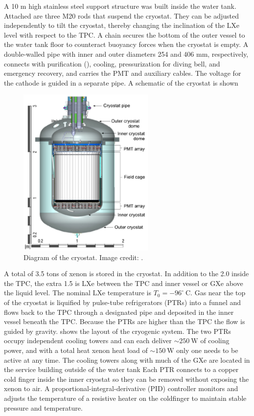 A 10 m high stainless steel support structure was built inside the water tank.  Attached are three M20 rods that suspend the
cryostat.  They can be adjusted independently to tilt the cryostat, thereby changing the inclination of the LXe level with respect to the
TPC.  A chain secures the bottom of the outer vessel to the water tank floor to counteract buoyancy forces when the cryostat is empty.  A
double-walled pipe with inner and outer diameters 254 and 406 mm, respectively, connects with purification (),
cooling,
pressurization for diving bell, and emergency recovery, and carries the PMT and auxiliary cables.  The voltage for the cathode is guided
in a separate pipe.  A schematic of the cryostat is shown

\begin{figure}
\centering
\includegraphics[width=0.6\textwidth]{CryostatDiagram}
\caption{Diagram of the cryostat.  Image credit: .}
\label{fig:xenon1t_cryo_cryostat_diagram}
\end{figure}

A total of 3.5 tons of xenon is stored in the cryostat.  In addition to the 2.0 inside the TPC, the extra 1.5 is LXe between the
TPC and inner vessel or GXe above the liquid level.  The nominal LXe temperature is $T_{0} = -96^{\circ}\ \mathrm{C}$.  Gas near the top of
the cryostat is liquified by pulse-tube refrigerators (PTRs) into a funnel and flows back to the TPC through a designated pipe and
deposited in the inner vessel beneath the TPC.  Because
the PTRs are higher than the TPC the flow is guided by gravity.   shows the layout of the cryogenic
system.  The two PTRs occupy independent cooling towers and can each deliver ${\sim} 250\ \mathrm{W}$ of cooling power, and with
a total heat xenon heat load of ${\sim} 150\ \mathrm{W}$ only one needs to be active at any time.  The cooling towers along with much of the
GXe are located in the service building outside of the water tank  Each PTR connects to a copper cold finger
inside the inner cryostat so they can be removed without exposing the xenon to air.  A proportional-integral-derivative (PID) controller
monitors and adjusts the temperature of a resistive heater on the coldfinger to maintain stable pressure and temperature.

